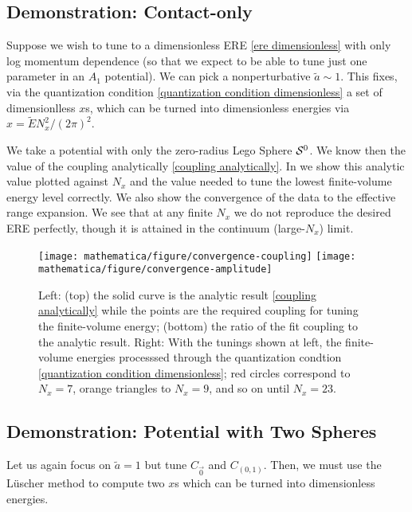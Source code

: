 \subsection{Demonstration: Contact-only}

Suppose we wish to tune to a dimensionless ERE \eqref{ere dimensionless} with only log momentum dependence (so that we expect to be able to tune just one parameter in an $A_1$ potential).
We can pick a nonperturbative $\tilde{a} \sim 1$.
This fixes, via the quantization condition \eqref{quantization condition dimensionless} a set of dimensionlless $x$s, which can be turned into dimensionless energies via $x=\tilde{E}N_x^2/(2\pi)^2$.

We take a potential with only the zero-radius Lego Sphere $\mathcal{S}^{0}$.
We know then the value of the coupling analytically \eqref{coupling analytically}.
In  we show this analytic value plotted against $N_x$ and the value needed to tune the lowest finite-volume energy level correctly.
We also show the convergence of the data to the effective range expansion.
We see that at any finite $N_x$ we do not reproduce the desired ERE perfectly, though it is attained in the continuum (large-$N_x$) limit.

\begin{figure}
	\texttt{[image: mathematica/figure/convergence-coupling]}
	\texttt{[image: mathematica/figure/convergence-amplitude]}
	\caption{
		Left:
			(top) the solid curve is the analytic result \eqref{coupling analytically} while the points are the required coupling for tuning the finite-volume energy;
			(bottom) the ratio of the fit coupling to the analytic result.
		Right:
			With the tunings shown at left, the finite-volume energies processsed through the quantization condtion \eqref{quantization condition dimensionless}; red circles correspond to $N_x=7$, orange triangles to $N_x=9$, and so on until $N_x=23$.
	}
	\label{fig:convergence contact}
\end{figure}

\subsection{Demonstration: Potential with Two Spheres}

Let us again focus on $\tilde{a} = 1$ but tune $C_{\vec{0}}$ and $C_{(0,1)}$.
Then, we must use the L\"{u}scher method to compute two $x$s which can be turned into dimensionless energies.

